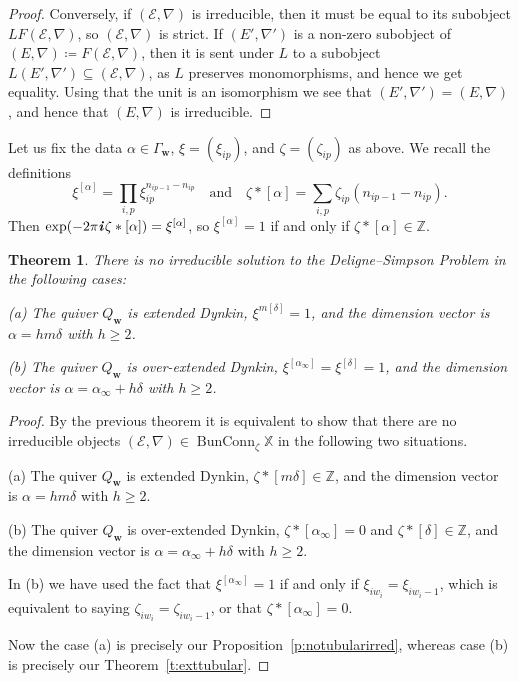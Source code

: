 \documentclass[12pt,a4paper]{amsart}
\theoremstyle{plain}
\newtheorem{thm}{Theorem}[section]
\newcommand{\Z}{\mathbb Z}
\DeclareMathOperator{\BunConn}{BunConn}
\newcommand{\E}{\mathcal E}
\newcommand{\XX}{\mathbb X}
\newcommand{\bw}{\mathbf w}
\newcommand{\I}{\textit{\textbf i}\mkern2mu}%
\begin{document}
\begin{proof}
Conversely, if $(\E,\nabla)$ is irreducible, then it must be equal to its subobject $LF(\E,\nabla)$, so $(\E,\nabla)$ is strict. If $(E',\nabla')$ is a non-zero subobject of $(E,\nabla)\coloneqq F(\E,\nabla)$, then it is sent under $L$ to a subobject $L(E',\nabla')\subseteq(\E,\nabla)$, as $L$ preserves monomorphisms, and hence we get equality. Using that the unit is an isomorphism we see that $(E',\nabla')=(E,\nabla)$, and hence that $(E,\nabla)$ is irreducible.
\end{proof}

Let us fix the data $\alpha\in\Gamma_\bw$, $\xi=(\xi_{ip})$, and $\zeta=(\zeta_{ip})$ as above. We recall the definitions
\[ \xi^{[\alpha]} = \prod_{i,p}\xi_{ip}^{n_{ip-1}-n_{ip}} \quad\textrm{and}\quad 
\zeta\ast[\alpha] = \sum_{i,p}\zeta_{ip}(n_{ip-1}-n_{ip}). \]
Then $\exp(-2\pi\I\zeta\ast[\alpha])=\xi^{[\alpha]}$, so $\xi^{[\alpha]}=1$ if and only if $\zeta\ast[\alpha]\in\Z$.

\begin{thm}
\label{t:nosolspecialcases}
There is no irreducible solution to the Deligne--Simpson Problem in the following cases:

(a) The quiver $Q_\bw$ is extended Dynkin, $\xi^{m[\delta]}=1$, and the dimension vector is $\alpha = h m \delta$ with $h\ge 2$.

(b) The quiver $Q_\bw$ is over-extended Dynkin, $\xi^{[\alpha_\infty]}=\xi^{[\delta]}=1$, and the dimension vector is $\alpha = \alpha_\infty + h\delta$ with $h\ge 2$.
\end{thm}


\begin{proof}
By the previous theorem it is equivalent to show that there are no irreducible objects $(\E,\nabla)\in\BunConn_\zeta\XX$ in the following two situations.

(a) The quiver $Q_\bw$ is extended Dynkin, $\zeta\ast[m\delta]\in\Z$, and the dimension vector is $\alpha=hm\delta$ with $h\geq2$.

(b) The quiver $Q_\bw$ is over-extended Dynkin, $\zeta\ast[\alpha_\infty]=0$ and $\zeta\ast[\delta]\in\Z$, and the dimension vector is $\alpha = \alpha_\infty + h\delta$ with $h\ge 2$.

In (b) we have used the fact that $\xi^{[\alpha_\infty]}=1$ if and only if $\xi_{iw_i}=\xi_{iw_i-1}$, which is equivalent to saying $\zeta_{iw_i}=\zeta_{iw_i-1}$, or that $\zeta\ast[\alpha_\infty]=0$.

Now the case (a) is precisely our Proposition~\ref{p:notubularirred}, whereas case (b) is precisely our Theorem~\ref{t:exttubular}.
\end{proof}
\end{document}
